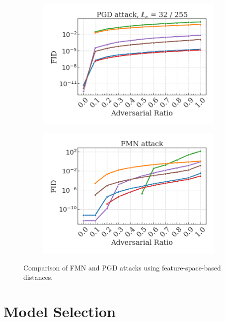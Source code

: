 \begin{figure}[H]
    \begin{subfigure}[b]{0.45\textwidth}
        \centering
        \includegraphics[width=\textwidth]{img/results_discussion/adversarial/PGD_FID.png}
    \end{subfigure}
    \hfill
    \begin{subfigure}[b]{0.45\textwidth}
        \centering
        \includegraphics[width=\textwidth]{img/results_discussion/adversarial/FMN_FID.png}
    \end{subfigure}

    \caption{Comparison of FMN and PGD attacks using feature-space-based distances.}
    \label{fig:comparison_feat_metrics}
\end{figure}

\newpage

\section{Model Selection}

